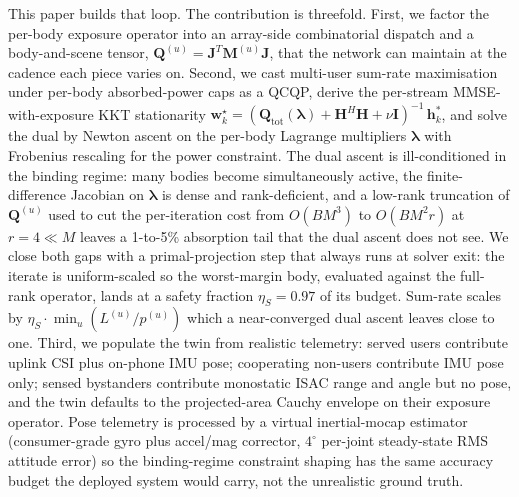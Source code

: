 \documentclass[journal,twocolumn,10pt]{IEEEtran}
\theoremstyle{plain}
\theoremstyle{remark}
\newcommand{\hh}{\mathbf{h}}
\newcommand{\ww}{\mathbf{w}}
\newcommand{\Qmat}{\mathbf{Q}}
\newcommand{\Mmat}{\mathbf{M}}
\newcommand{\Jmat}{\mathbf{J}}
\begin{document}
This paper builds that loop. The contribution is threefold. First,
we factor the per-body exposure operator into an array-side
combinatorial dispatch and a body-and-scene tensor,
$\Qmat^{(u)} = \Jmat^T \Mmat^{(u)} \Jmat$, that the network can
maintain at the cadence each piece varies on. Second, we cast
multi-user sum-rate maximisation under per-body absorbed-power caps
as a QCQP, derive the per-stream MMSE-with-exposure KKT stationarity
$\ww_k^\star = (\Qmat_{\mathrm{tot}}(\bm\lambda) + \mathbf{H}^H
\mathbf{H} + \nu \mathbf{I})^{-1}\,\hh_k^*$, and solve the dual by
Newton ascent on the per-body Lagrange multipliers $\bm\lambda$ with
Frobenius rescaling for the power constraint. The dual ascent is
ill-conditioned in the binding regime: many bodies become
simultaneously active, the finite-difference Jacobian on
$\bm\lambda$ is dense and rank-deficient, and a low-rank truncation
of $\Qmat^{(u)}$ used to cut the per-iteration cost from $O(B M^3)$
to $O(B M^2 r)$ at $r = 4 \ll M$ leaves a 1-to-5\% absorption tail
that the dual ascent does not see. We close both gaps with a
primal-projection step that always runs at solver exit: the iterate
is uniform-scaled so the worst-margin body, evaluated against the
full-rank operator, lands at a safety fraction $\eta_S = 0.97$ of
its budget. Sum-rate scales by $\eta_S \cdot \min_u(L^{(u)}/p^{(u)})$
which a near-converged dual ascent leaves close to one. Third, we
populate the twin from realistic telemetry: served users contribute
uplink CSI plus on-phone IMU pose; cooperating non-users contribute
IMU pose only; sensed bystanders contribute monostatic ISAC range
and angle but no pose, and the twin defaults to the projected-area
Cauchy envelope on their exposure operator. Pose telemetry is
processed by a virtual inertial-mocap estimator (consumer-grade gyro
plus accel/mag corrector, $4^\circ$ per-joint steady-state RMS
attitude error) so the binding-regime constraint shaping has the
same accuracy budget the deployed system would carry, not the
unrealistic ground truth.
\end{document}
